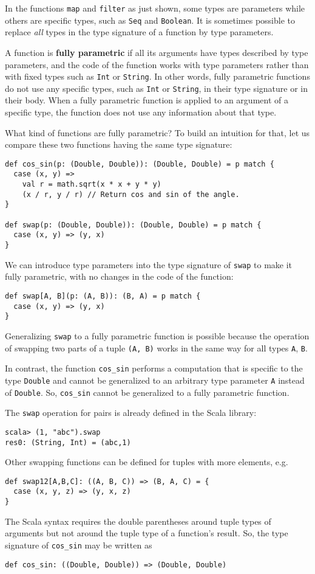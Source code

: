 In the functions \lstinline!map! and \lstinline!filter! as just
shown, some types are parameters while others are specific types,
such as \lstinline!Seq! and \lstinline!Boolean!. It is sometimes
possible to replace \emph{all} types in the type signature of a function
by type parameters.

A function is \textbf{fully parametric}
if all its arguments have types described by type parameters, and
the code of the function works with type parameters rather than with
fixed types such as \lstinline!Int! or \lstinline!String!. In other
words, fully parametric functions do not use any specific types, such
as \lstinline!Int! or \lstinline!String!, in their type signature
or in their body. When a fully parametric function is applied to an
argument of a specific type, the function does not use any information
about that type. 

What kind of functions are fully parametric? To build an intuition
for that, let us compare these two functions having the same type
signature:
\begin{lstlisting}
def cos_sin(p: (Double, Double)): (Double, Double) = p match {
  case (x, y) =>
    val r = math.sqrt(x * x + y * y)
    (x / r, y / r) // Return cos and sin of the angle.
}

def swap(p: (Double, Double)): (Double, Double) = p match {
  case (x, y) => (y, x)
}
\end{lstlisting}
We can introduce type parameters into the type signature of \lstinline!swap!
to make it fully parametric, with no changes in the code of the function:
\begin{lstlisting}
def swap[A, B](p: (A, B)): (B, A) = p match {
  case (x, y) => (y, x)
}
\end{lstlisting}
Generalizing \lstinline!swap! to a fully parametric function is possible
because the operation of swapping two parts of a tuple \lstinline!(A, B)!
works in the same way for all types \lstinline!A!, \lstinline!B!.

In contrast, the function \lstinline!cos_sin! performs a computation
that is specific to the type \lstinline!Double! and cannot be generalized
to an arbitrary type parameter \lstinline!A! instead of \lstinline!Double!.
So, \lstinline!cos_sin! cannot be generalized to a fully parametric
function.

The \lstinline!swap! operation for pairs is already defined in the
Scala library:
\begin{lstlisting}
scala> (1, "abc").swap
res0: (String, Int) = (abc,1)
\end{lstlisting}
Other swapping functions can be defined for tuples with more elements,
e.g.
\begin{lstlisting}
def swap12[A,B,C]: ((A, B, C)) => (B, A, C) = {
  case (x, y, z) => (y, x, z)
}
\end{lstlisting}
The Scala syntax requires the double parentheses around tuple types
of arguments but not around the tuple type of a function's result.
So, the type signature of \lstinline!cos_sin! may be written as
\begin{lstlisting}
def cos_sin: ((Double, Double)) => (Double, Double)
\end{lstlisting}


